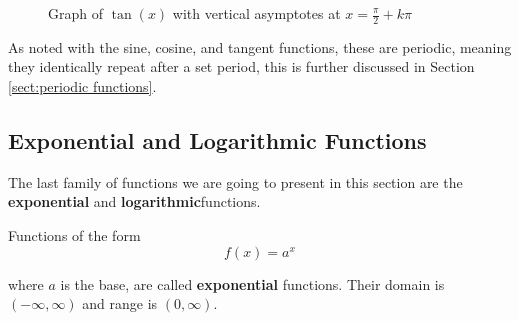         \begin{figure}
            \centering
            \caption{Graph of $\tan(x)$ with vertical asymptotes at $x = \frac{\pi}{2} + k\pi$}
            \label{fig:tangentgraph}
        \end{figure}

        As noted with the sine, cosine, and tangent functions, these are periodic, meaning they identically repeat after a set period, this is further discussed in Section \ref{sect:periodic functions}.

        \subsection{Exponential and Logarithmic Functions}
        \label{sect:explog}
        The last family of functions we are going to present in this section are the \textbf{exponential} and \textbf{logarithmic}functions.

        \begin{definition}
            Functions of the form
            \begin{equation}
                f(x) = a^x
            \end{equation}

            where $a$ is the base, are called \textbf{exponential} functions. Their domain is $(-\infty,\infty)$ and range is $(0,\infty)$.
        \end{definition}


